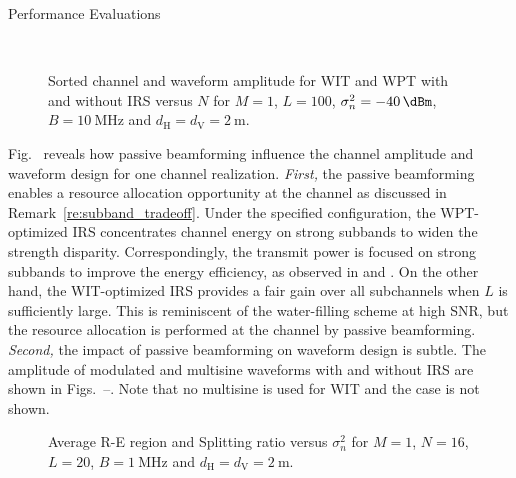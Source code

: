 \documentclass[journal]{IEEEtran}
\begin{document}
\begin{section}{Performance Evaluations}
		\begin{figure}[!t]
			\centering
			\\
			\caption{Sorted channel and waveform amplitude for WIT and WPT with and without IRS versus $N$ for $M=1$, $L=100$, $\sigma_n^2=\SI{-40}{\dBm}$, $B=\SI{10}{\MHz}$ and $d_{\mathrm{H}}=d_{\mathrm{V}}=\SI{2}{\meter}$.}
		\end{figure}

		Fig.~ reveals how passive beamforming influence the channel amplitude and waveform design for one channel realization. \emph{First,} the passive beamforming enables a resource allocation opportunity at the channel as discussed in Remark~\ref{re:subband_tradeoff}. Under the specified configuration, the WPT-optimized IRS concentrates channel energy on strong subbands to widen the strength disparity. Correspondingly, the transmit power is focused on strong subbands to improve the energy efficiency, as observed in  and . On the other hand, the WIT-optimized IRS provides a fair gain over all subchannels when $L$ is sufficiently large. This is reminiscent of the water-filling scheme at high SNR, but the resource allocation is performed at the channel by passive beamforming. \emph{Second,} the impact of passive beamforming on waveform design is subtle. The amplitude of modulated and multisine waveforms with and without IRS are shown in Figs.~--. Note that no multisine is used for WIT and the case is not shown.

		\begin{figure}[!t]
			\centering
			\caption{Average R-E region and Splitting ratio versus $\sigma_n^2$ for $M=1$, $N=16$, $L=20$, $B=\SI{1}{\MHz}$ and $d_{\mathrm{H}}=d_{\mathrm{V}}=\SI{2}{\meter}$.}
		\end{figure}


\end{section}
\end{document}
